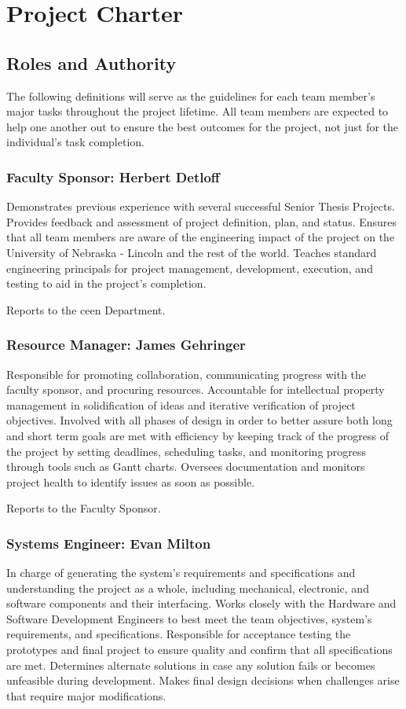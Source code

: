\chapter{Project Charter}

\section{Roles and Authority}
The following definitions will serve as the guidelines for each team member's major tasks throughout the project lifetime. 
All team members are expected to help one another out to ensure the best outcomes for the project, not just for the individual's task completion.

\subsection{Faculty Sponsor: Herbert Detloff}
Demonstrates previous experience with several successful Senior Thesis Projects.
Provides feedback and assessment of project definition, plan, and status.
Ensures that all team members are aware of the engineering impact of the project on the University of Nebraska - Lincoln and the rest of the world.
Teaches standard engineering principals for project management, development, execution, and testing to aid in the project's completion.

Reports to the \gls{ceen} Department.

\subsection{Resource Manager: James Gehringer}
Responsible for promoting collaboration, communicating progress with the faculty sponsor, and procuring resources.
Accountable for intellectual property management in solidification of ideas and iterative verification of project objectives.
Involved with all phases of design in order to better assure both long and short term goals are met with efficiency by keeping track of the progress of the project by setting deadlines, scheduling tasks, and monitoring progress through tools such as Gantt charts.
Oversees documentation and monitors project health to identify issues as soon as possible.

Reports to the Faculty Sponsor. 

\subsection{Systems Engineer: Evan Milton}
In charge of generating the system's requirements and specifications and understanding the project as a whole, including mechanical, electronic, and software components and their interfacing.
Works closely with the Hardware and Software Development Engineers to best meet the team objectives, system's requirements, and specifications.
Responsible for acceptance testing the prototypes and final project to ensure quality and confirm that all specifications are met.
Determines alternate solutions in case any solution fails or becomes unfeasible during development.
Makes final design decisions when challenges arise that require major modifications.

